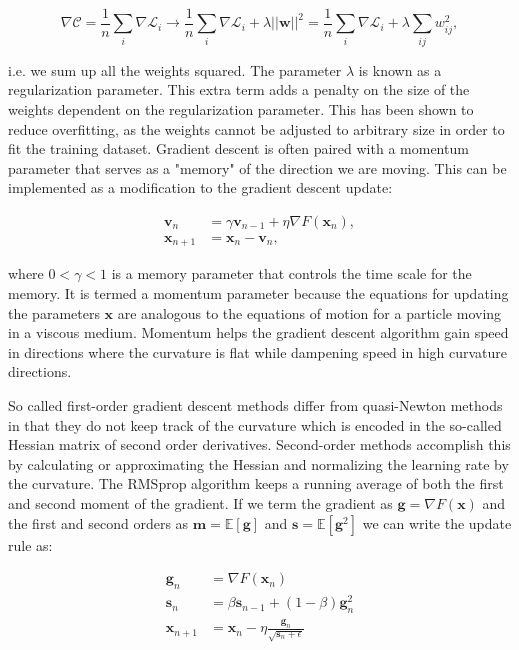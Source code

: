 \begin{equation}
 \nabla \mathcal{C} = \frac{1}{n} \sum_i \nabla \mathcal{L}_i
    \rightarrow \frac{1}{n} \sum_i \nabla \mathcal{L}_i
    + \lambda \left| \left| \bm{w} \right| \right|^2
    = \frac{1}{n} \sum_i \nabla \mathcal{L}_i
    + \lambda \sum_{ij} w_{ij}^2 , 
\end{equation}

i.e. we sum up all the weights squared.
The parameter $\lambda$ is known as a regularization parameter.
This extra term adds a penalty on the size of the weights
dependent on the regularization parameter. This has
been shown to reduce overfitting, as the weights
cannot be adjusted to arbitrary size in order
to fit the training dataset.
Gradient descent is often paired with a momentum parameter
that serves as a "memory" of the direction we are moving.
This can be implemented as a modification to the
gradient descent update:

\begin{equation}
    \begin{split}
        \bm{v}_n &= \gamma \bm{v}_{n-1} + \eta \nabla F(\bm{x}_n) , \\
        \bm{x}_{n+1} &= \bm{x}_n - \bm{v}_n ,
    \end{split}
\end{equation}

where $0 < \gamma < 1$ is a memory parameter
that controls the time scale for the memory.
It is termed a momentum parameter because the equations
for updating the parameters $\bm{x}$ are analogous to
the equations of motion for a particle moving
in a viscous medium. Momentum helps the gradient descent
algorithm gain speed in directions where the curvature
is flat while dampening speed in high curvature directions.
\par
So called first-order gradient descent methods differ from quasi-Newton methods
in that they do not keep track of the curvature which is encoded
in the so-called Hessian matrix of second order derivatives.
Second-order methods accomplish this by calculating or approximating
the Hessian and normalizing the learning rate by the curvature.
The RMSprop algorithm keeps a running average of both the
first and second moment of the gradient. If we term
the gradient as $\bm{g} = \nabla F(\bm{x})$
and the first and second orders as
$\bm{m} = \mathbb{E}[\bm{g}]$ and $\bm{s} = \mathbb{E}[\bm{g}^2]$
we can write the update rule as:

\begin{equation}
    \begin{split}
        \bm{g}_n &= \nabla F(\bm{x}_n) \\
        \bm{s}_n &= \beta \bm{s}_{n-1} + (1 - \beta)\bm{g}_{n}^2 \\
        \bm{x}_{n+1} &= \bm{x}_n - \eta \frac{\bm{g}_n}
        {\sqrt{\bm{s}_n + \epsilon}}
    \end{split}
\end{equation}

